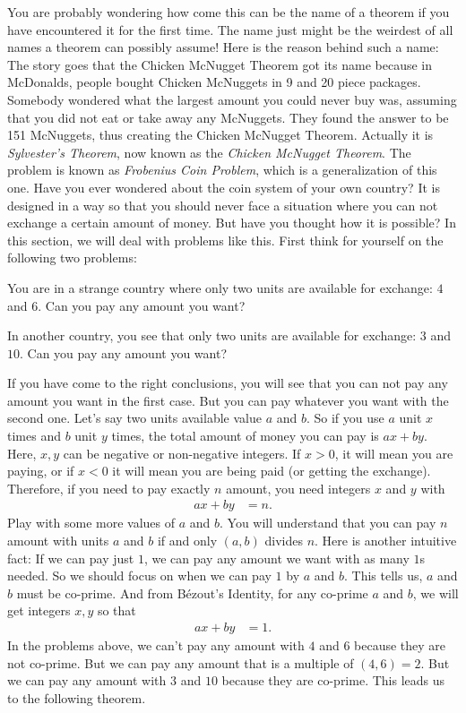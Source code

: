 \documentclass{subfile}
\begin{document}
	You are probably wondering how come this can be the name of a theorem if you have encountered it for the first time. The name just might be the weirdest of all names a theorem can possibly assume! Here is the reason behind such a name: The story goes that the Chicken McNugget Theorem got its name because in McDonalds, people bought Chicken McNuggets in 9 and 20 piece packages. Somebody wondered what the largest amount you could never buy was, assuming that you did not eat or take away any McNuggets. They found the answer to be 151 McNuggets, thus creating the Chicken McNugget Theorem. Actually it is \textit{Sylvester's Theorem}, now known as the \textit{Chicken McNugget Theorem}. The problem is known as \textit{Frobenius Coin Problem}, which is a generalization of this one. Have you ever wondered about the coin system of your own country? It is designed in a way so that you should never face a situation where you can not exchange a certain amount of money. But have you thought how it is possible? In this section, we will deal with problems like this. First think for yourself on the following two problems:
		\begin{problem}
			You are in a strange country where only two units are available for exchange: $4$ and $6$. Can you pay any amount you want?
		\end{problem}
		
		\begin{problem}
			In another country, you see that only two units are available for exchange: $3$ and $10$. Can you pay any amount you want?
		\end{problem}
		
	If you have come to the right conclusions, you will see that you can not pay any amount you want in the first case. But you can pay whatever you want with the second one. Let's say two units available value $a$ and $b$. So if you use $a$ unit $x$ times and $b$ unit $y$ times, the total amount of money you can pay is $ax+by$. Here, $x,y$ can be negative or non-negative integers. If $x>0$, it will mean you are paying, or if $x<0$ it will mean you are being paid (or getting the exchange). Therefore, if you need to pay exactly $n$ amount, you need integers $x$ and $y$ with 
		\begin{align*}
			ax+by & = n.
		\end{align*}
	Play with some more values of $a$ and $b$. You will understand that you can pay $n$ amount with units $a$ and $b$ if and only $(a,b)$ divides $n$. Here is another intuitive fact: If we can pay just $1$, we can pay any amount we want with as many $1$s needed. So we should focus on when we can pay $1$ by $a$ and $b$. This tells us, $a$ and $b$ must be co-prime. And from B\'{e}zout's Identity, for any co-prime $a$ and $b$, we will get integers $x,y$ so that
		\begin{align*}
			ax+by & = 1.
		\end{align*}
	In the problems above, we can't pay any amount with $4$ and $6$ because they are not co-prime. But we can pay any amount that is a multiple of $(4,6)=2$. But we can pay any amount with $3$ and $10$ because they are co-prime. This leads us to the following theorem.
	
\end{document}
